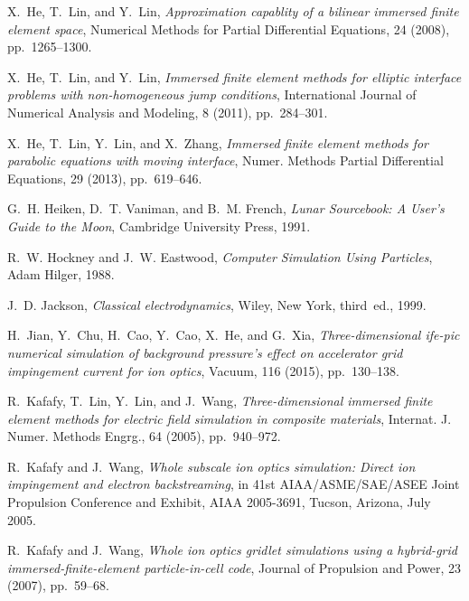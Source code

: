 \documentclass{siamart171218}
\begin{document}
\begin{thebibliography}{99}
{\sc X.~He, T.~Lin, and Y.~Lin}, {\em Approximation capablity of a bilinear
  immersed finite element space}, Numerical Methods for Partial Differential
  Equations, 24 (2008), pp.~1265--1300.

{\sc X.~He, T.~Lin, and Y.~Lin}, {\em Immersed finite element methods for
  elliptic interface problems with non-homogeneous jump conditions},
  International Journal of Numerical Analysis and Modeling, 8 (2011),
  pp.~284--301.

{\sc X.~He, T.~Lin, Y.~Lin, and X.~Zhang}, {\em Immersed finite element methods
  for parabolic equations with moving interface}, Numer. Methods Partial
  Differential Equations, 29 (2013), pp.~619--646.

{\sc G.~H. Heiken, D.~T. Vaniman, and B.~M. French}, {\em Lunar Sourcebook: A
  User's Guide to the Moon}, Cambridge University Press, 1991.

{\sc R.~W. Hockney and J.~W. Eastwood}, {\em Computer Simulation Using
  Particles}, Adam Hilger, 1988.

{\sc J.~D. Jackson}, {\em Classical electrodynamics}, Wiley, New York,
  third~ed., 1999.

{\sc H.~Jian, Y.~Chu, H.~Cao, Y.~Cao, X.~He, and G.~Xia}, {\em
  Three-dimensional ife-pic numerical simulation of background pressure's
  effect on accelerator grid impingement current for ion optics}, Vacuum, 116
  (2015), pp.~130--138.

{\sc R.~Kafafy, T.~Lin, Y.~Lin, and J.~Wang}, {\em Three-dimensional immersed
  finite element methods for electric field simulation in composite materials},
  Internat. J. Numer. Methods Engrg., 64 (2005), pp.~940--972.

{\sc R.~Kafafy and J.~Wang}, {\em Whole subscale ion optics simulation: Direct
  ion impingement and electron backstreaming}, in 41st AIAA/ASME/SAE/ASEE Joint
  Propulsion Conference and Exhibit, AIAA 2005-3691, Tucson, Arizona, July
  2005.

{\sc R.~Kafafy and J.~Wang}, {\em Whole ion optics gridlet simulations using a
  hybrid-grid immersed-finite-element particle-in-cell code}, Journal of
  Propulsion and Power, 23 (2007), pp.~59--68.


\end{thebibliography}
\end{document}
